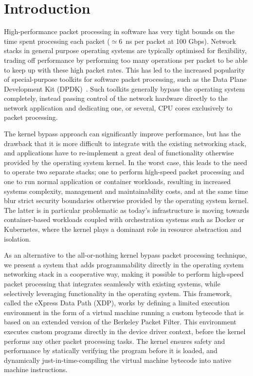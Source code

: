 \documentclass[10pt,sigconf]{acmart}
\begin{document}

\maketitle

\section{Introduction}%
\label{sec:introduction}
High-performance packet processing in software has very tight bounds on the time
spent processing each packet ($\simeq6$~ns per packet at 100 Gbps). Network
stacks in general purpose operating systems are typically optimised for
flexibility, trading off performance by performing too many operations per
packet to be able to keep up with these high packet rates. This has led to the
increased popularity of special-purpose toolkits for software packet processing,
such as the Data Plane Development Kit (DPDK)~\cite{dpdk}. Such toolkits
generally bypass the operating system completely, instead passing control of the
network hardware directly to the network application and dedicating one, or
several, CPU cores exclusively to packet processing.

The kernel bypass approach can significantly improve performance, but has the
drawback that it is more difficult to integrate with the existing networking
stack, and applications have to re-implement a great deal of functionality
otherwise provided by the operating system kernel. In the worst case, this leads
to the need to operate two separate stacks; one to perform high-speed packet
processing and one to run normal application or container workloads, resulting
in increased systems complexity, management and maintainability costs, and at
the same time blur strict security boundaries otherwise provided by the
operating system kernel. The latter is in particular problematic as today's
infrastructure is moving towards container-based workloads coupled with
orchestration systems such as Docker or Kubernetes, where the kernel plays a
dominant role in resource abstraction and isolation.

As an alternative to the all-or-nothing kernel bypass packet processing
technique, we present a system that adds programmability directly in the
operating system networking stack in a cooperative way, making it possible to
perform high-speed packet processing that integrates seamlessly with existing
systems, while selectively leveraging functionality in the operating system.
This framework, called the eXpress Data Path (XDP), works by defining a limited
execution environment in the form of a virtual machine running a custom bytecode
that is based on an extended version of the Berkeley Packet Filter. This
environment executes custom programs directly in the device driver context,
before the kernel performs any other packet processing tasks. The kernel ensures
safety and performance by statically verifying the program before it is loaded,
and dynamically just-in-time-compiling the virtual machine bytecode into native
machine instructions.
\end{document}
